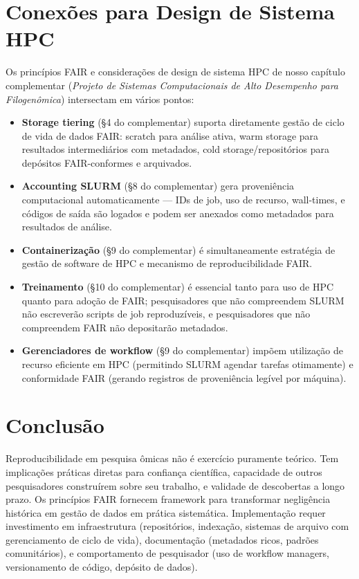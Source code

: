 \section{Conexões para Design de Sistema HPC}

Os princípios FAIR e considerações de design de sistema HPC de nosso capítulo complementar (\textit{Projeto de Sistemas Computacionais de Alto Desempenho para Filogenômica}) intersectam em vários pontos:

\begin{itemize}
\item \textbf{Storage tiering} (\S{}4 do complementar) suporta diretamente gestão de ciclo de vida de dados FAIR: scratch para análise ativa, warm storage para resultados intermediários com metadados, cold storage/repositórios para depósitos FAIR-conformes e arquivados.

\item \textbf{Accounting SLURM} (\S{}8 do complementar) gera proveniência computacional automaticamente --- IDs de job, uso de recurso, wall-times, e códigos de saída são logados e podem ser anexados como metadados para resultados de análise.

\item \textbf{Containerização} (\S{}9 do complementar) é simultaneamente estratégia de gestão de software de HPC e mecanismo de reproducibilidade FAIR.

\item \textbf{Treinamento} (\S{}10 do complementar) é essencial tanto para uso de HPC quanto para adoção de FAIR; pesquisadores que não compreendem SLURM não escreverão scripts de job reproduzíveis, e pesquisadores que não compreendem FAIR não depositarão metadados.

\item \textbf{Gerenciadores de workflow} (\S{}9 do complementar) impõem utilização de recurso eficiente em HPC (permitindo SLURM agendar tarefas otimamente) e conformidade FAIR (gerando registros de proveniência legível por máquina).
\end{itemize}

\section{Conclusão}

Reproducibilidade em pesquisa ômicas não é exercício puramente teórico. Tem implicações práticas diretas para confiança científica, capacidade de outros pesquisadores construírem sobre seu trabalho, e validade de descobertas a longo prazo. Os princípios FAIR fornecem framework para transformar negligência histórica em gestão de dados em prática sistemática. Implementação requer investimento em infraestrutura (repositórios, indexação, sistemas de arquivo com gerenciamento de ciclo de vida), documentação (metadados ricos, padrões comunitários), e comportamento de pesquisador (uso de workflow managers, versionamento de código, depósito de dados).

